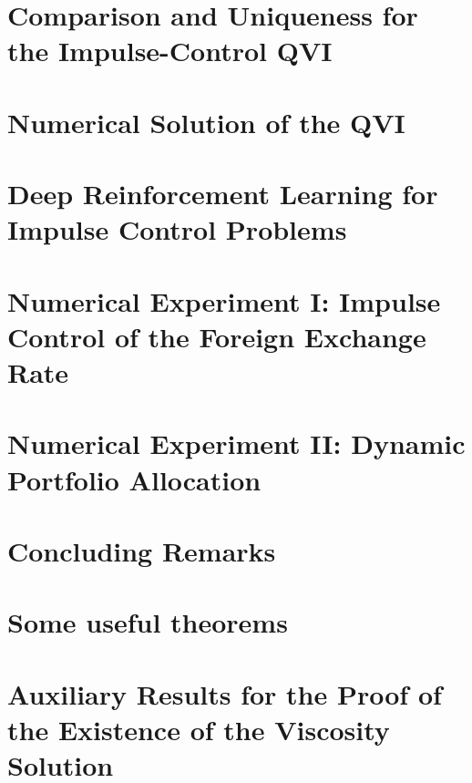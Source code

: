 \documentclass[a4paper, 12pt, openany, twoside]{book}
\makeatletter
\newcommand{\clearemptydoublepage}{%
    \clearpage
    \if@twoside
        \ifodd\c@page
        \else
            \hbox{}%
            \thispagestyle{empty}%
            \newpage
            \if@twocolumn
                \hbox{}%
                \thispagestyle{empty}%
                \newpage
            \fi
        \fi
    \fi
}
\renewcommand{\cleardoublepage}{\clearemptydoublepage}
\theoremstyle{plain}
\theoremstyle{definition}
\theoremstyle{remark}
\numberwithin{equation}{section}
\makeatother
\begin{document}
\chapter{Comparison and Uniqueness for the Impulse-Control QVI}

\cleardoublepage

\chapter{Numerical Solution of the QVI}

\cleardoublepage

\chapter{Deep Reinforcement Learning for Impulse Control Problems}

\cleardoublepage

\chapter{Numerical Experiment I: Impulse Control of the Foreign Exchange Rate}

\cleardoublepage

\chapter{Numerical Experiment II: Dynamic Portfolio Allocation}

\cleardoublepage

\chapter{Concluding Remarks}

\cleardoublepage

\printbibliography[heading=bibintoc, title={References}]
\cleardoublepage

\appendix
{}
{}

\chapter{Some useful theorems}

\cleardoublepage

\chapter{Auxiliary Results for the Proof of the Existence of the
Viscosity Solution}

\cleardoublepage
\end{document}
